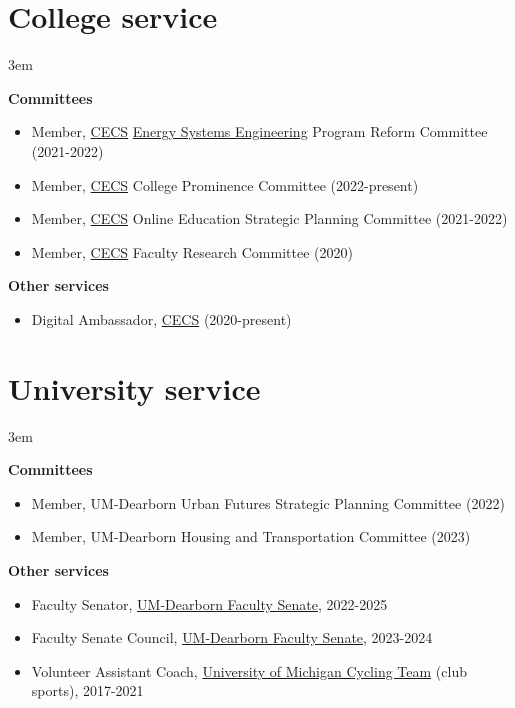 \documentclass[11pt]{article}
\newenvironment{main}
{\begin{adjustwidth}{3em}{}}
{\end{adjustwidth}}
\begin{document}
\section*{College service}
\begin{main}

\textbf{Committees}
\begin{itemize}
    \item Member, \href{https://umdearborn.edu/cecs}{CECS} \href{https://umdearborn.edu/cecs/departments/electrical-and-computer-engineering/graduate-programs/mse-energy-systems-engineering}{Energy Systems Engineering} Program Reform Committee (2021-2022)
    \item Member, \href{https://umdearborn.edu/cecs}{CECS} College Prominence Committee (2022-present)
    \item Member, \href{https://umdearborn.edu/cecs}{CECS} Online Education Strategic Planning Committee (2021-2022)
    \item Member, \href{https://umdearborn.edu/cecs}{CECS} Faculty Research Committee (2020)
\end{itemize}

\textbf{Other services}
\begin{itemize}
    \item Digital Ambassador, \href{https://umdearborn.edu/cecs}{CECS} (2020-present)
\end{itemize}

\end{main}
\section*{University service}
\begin{main}

\textbf{Committees}

\begin{itemize}
    \item Member, UM-Dearborn Urban Futures Strategic Planning Committee (2022)
    \item Member, UM-Dearborn Housing and Transportation Committee (2023)
\end{itemize}

\textbf{Other services}

\begin{itemize}
    \item Faculty Senator, \href{https://umdearborn.edu/faculty-senate}{UM-Dearborn Faculty Senate}, 2022-2025
    \item Faculty Senate Council, \href{https://umdearborn.edu/faculty-senate}{UM-Dearborn Faculty Senate}, 2023-2024
    \item Volunteer Assistant Coach, \href{https://www.umcycling.org/}{University of Michigan Cycling Team} (club sports), 2017-2021
\end{itemize}


\end{main}
\end{document}
